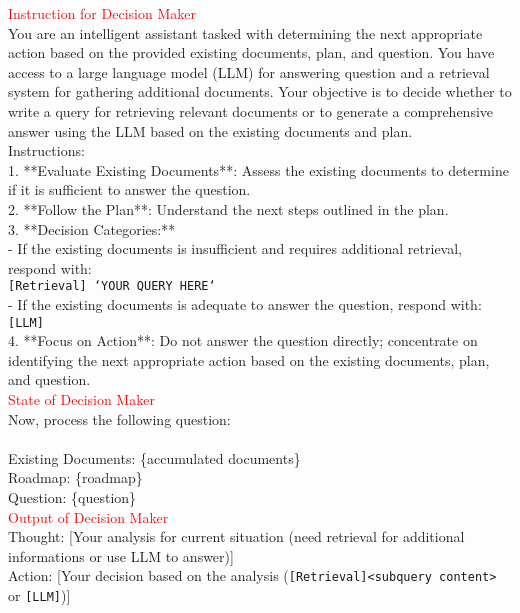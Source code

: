 \begin{tcolorbox}[title=Decision Maker,width=\linewidth, breakable]
\begin{small}
\textcolor{red}{Instruction for Decision Maker}\\
You are an intelligent assistant tasked with determining the next appropriate action based on the provided existing documents, plan, and question. You have access to a large language model (LLM) for answering question and a retrieval system for gathering additional documents. Your objective is to decide whether to write a query for retrieving relevant documents or to generate a comprehensive answer using the LLM based on the existing documents and plan.\\

Instructions:\\
1. **Evaluate Existing Documents**: Assess the existing documents to determine if it is sufficient to answer the question.\\
2. **Follow the Plan**: Understand the next steps outlined in the plan.\\
3. **Decision Categories:**\\
    - If the existing documents is insufficient and requires additional retrieval, respond with:\\
        \texttt{[Retrieval] `YOUR QUERY HERE`}\\
    - If the existing documents is adequate to answer the question, respond with:\\
        \texttt{[LLM]}\\
4. **Focus on Action**: Do not answer the question directly; concentrate on identifying the next appropriate action based on the existing documents, plan, and question.\\

\textcolor{red}{State of Decision Maker}\\
Now, process the following question:\\
\\
Existing Documents: \{accumulated documents\}\\

Roadmap: \{roadmap\}\\

Question: \{question\}\\

\textcolor{red}{Output of Decision Maker}\\
Thought: {[}Your analysis for current situation (need retrieval for additional informations or use LLM to answer){]}\\
Action: {[}Your decision based on the analysis (\texttt{[Retrieval]<subquery content>} or \texttt{[LLM]}){]}
\end{small}
\end{tcolorbox}
